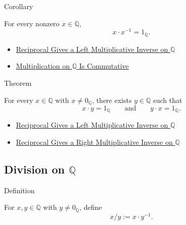\begin{corollarybox}{Corollary}
\begin{corollary}
\label{cor:reciprocal-right-multiplicative-inverse-on-q}
For every nonzero $x\in\mathbb{Q}$,
\[
x\cdot x^{-1}=1_{\mathbb{Q}}.
\]
\end{corollary}
\end{corollarybox}

\begin{dependencies}
\begin{itemize}
  \item \hyperref[thm:reciprocal-left-multiplicative-inverse-on-q]{Reciprocal Gives a Left Multiplicative Inverse on $\mathbb{Q}$}
  \item \hyperref[thm:multiplication-on-q-commutative]{Multiplication on $\mathbb{Q}$ Is Commutative}
\end{itemize}
\end{dependencies}

\begin{theorembox}{Theorem}
\begin{theorem}
\label{thm:every-nonzero-rational-has-multiplicative-inverse}
For every $x\in\mathbb{Q}$ with $x\ne 0_{\mathbb{Q}}$, there exists
$y\in\mathbb{Q}$ such that
\[
x\cdot y=1_{\mathbb{Q}}
\qquad\text{and}\qquad
y\cdot x=1_{\mathbb{Q}}.
\]
\end{theorem}
\end{theorembox}

\begin{dependencies}
\begin{itemize}
  \item \hyperref[thm:reciprocal-left-multiplicative-inverse-on-q]{Reciprocal Gives a Left Multiplicative Inverse on $\mathbb{Q}$}
  \item \hyperref[cor:reciprocal-right-multiplicative-inverse-on-q]{Reciprocal Gives a Right Multiplicative Inverse on $\mathbb{Q}$}
\end{itemize}
\end{dependencies}

\subsection*{\texorpdfstring{Division on $\mathbb{Q}$}{Division on Q}}

\begin{definitionbox}{Definition}
\begin{definition}
\label{def:division-on-q}
For $x,y\in\mathbb{Q}$ with $y\ne 0_{\mathbb{Q}}$, define
\[
x/y:=x\cdot y^{-1}.
\]
\end{definition}
\end{definitionbox}

